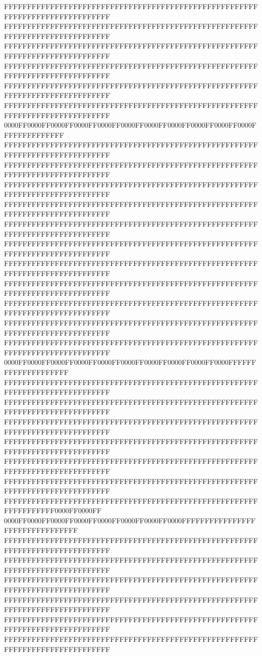 FFFFFFFFFFFFFFFFFFFFFFFFFFFFFFFFFFFFFFFFFFFFFFFFFFFFFFFFFFFFFFFFFFFFFFFFFFFFFF
FFFFFFFFFFFFFFFFFFFFFFFFFFFFFFFFFFFFFFFFFFFFFFFFFFFFFFFFFFFFFFFFFFFFFFFFFFFFFF
FFFFFFFFFFFFFFFFFFFFFFFFFFFFFFFFFFFFFFFFFFFFFFFFFFFFFFFFFFFFFFFFFFFFFFFFFFFFFF
FFFFFFFFFFFFFFFFFFFFFFFFFFFFFFFFFFFFFFFFFFFFFFFFFFFFFFFFFFFFFFFFFFFFFFFFFFFFFF
FFFFFFFFFFFFFFFFFFFFFFFFFFFFFFFFFFFFFFFFFFFFFFFFFFFFFFFFFFFFFFFFFFFFFFFFFFFFFF
FFFFFFFFFFFFFFFFFFFFFFFFFFFFFFFFFFFFFFFFFFFFFFFFFFFFFFFFFFFFFFFFFFFFFFFFFFFFFF
0000FF0000FF0000FF0000FF0000FF0000FF0000FF0000FF0000FF0000FF0000FFFFFFFFFFFFFF
FFFFFFFFFFFFFFFFFFFFFFFFFFFFFFFFFFFFFFFFFFFFFFFFFFFFFFFFFFFFFFFFFFFFFFFFFFFFFF
FFFFFFFFFFFFFFFFFFFFFFFFFFFFFFFFFFFFFFFFFFFFFFFFFFFFFFFFFFFFFFFFFFFFFFFFFFFFFF
FFFFFFFFFFFFFFFFFFFFFFFFFFFFFFFFFFFFFFFFFFFFFFFFFFFFFFFFFFFFFFFFFFFFFFFFFFFFFF
FFFFFFFFFFFFFFFFFFFFFFFFFFFFFFFFFFFFFFFFFFFFFFFFFFFFFFFFFFFFFFFFFFFFFFFFFFFFFF
FFFFFFFFFFFFFFFFFFFFFFFFFFFFFFFFFFFFFFFFFFFFFFFFFFFFFFFFFFFFFFFFFFFFFFFFFFFFFF
FFFFFFFFFFFFFFFFFFFFFFFFFFFFFFFFFFFFFFFFFFFFFFFFFFFFFFFFFFFFFFFFFFFFFFFFFFFFFF
FFFFFFFFFFFFFFFFFFFFFFFFFFFFFFFFFFFFFFFFFFFFFFFFFFFFFFFFFFFFFFFFFFFFFFFFFFFFFF
FFFFFFFFFFFFFFFFFFFFFFFFFFFFFFFFFFFFFFFFFFFFFFFFFFFFFFFFFFFFFFFFFFFFFFFFFFFFFF
FFFFFFFFFFFFFFFFFFFFFFFFFFFFFFFFFFFFFFFFFFFFFFFFFFFFFFFFFFFFFFFFFFFFFFFFFFFFFF
FFFFFFFFFFFFFFFFFFFFFFFFFFFFFFFFFFFFFFFFFFFFFFFFFFFFFFFFFFFFFFFFFFFFFFFFFFFFFF
FFFFFFFFFFFFFFFFFFFFFFFFFFFFFFFFFFFFFFFFFFFFFFFFFFFFFFFFFFFFFFFFFFFFFFFFFFFFFF
0000FF0000FF0000FF0000FF0000FF0000FF0000FF0000FF0000FF0000FFFFFFFFFFFFFFFFFFFF
FFFFFFFFFFFFFFFFFFFFFFFFFFFFFFFFFFFFFFFFFFFFFFFFFFFFFFFFFFFFFFFFFFFFFFFFFFFFFF
FFFFFFFFFFFFFFFFFFFFFFFFFFFFFFFFFFFFFFFFFFFFFFFFFFFFFFFFFFFFFFFFFFFFFFFFFFFFFF
FFFFFFFFFFFFFFFFFFFFFFFFFFFFFFFFFFFFFFFFFFFFFFFFFFFFFFFFFFFFFFFFFFFFFFFFFFFFFF
FFFFFFFFFFFFFFFFFFFFFFFFFFFFFFFFFFFFFFFFFFFFFFFFFFFFFFFFFFFFFFFFFFFFFFFFFFFFFF
FFFFFFFFFFFFFFFFFFFFFFFFFFFFFFFFFFFFFFFFFFFFFFFFFFFFFFFFFFFFFFFFFFFFFFFFFFFFFF
FFFFFFFFFFFFFFFFFFFFFFFFFFFFFFFFFFFFFFFFFFFFFFFFFFFFFFFFFFFFFFFFFFFFFFFFFFFFFF
FFFFFFFFFFFFFFFFFFFFFFFFFFFFFFFFFFFFFFFFFFFFFFFFFFFFFFFFFFFFFFFFFF0000FF0000FF
0000FF0000FF0000FF0000FF0000FF0000FF0000FF0000FFFFFFFFFFFFFFFFFFFFFFFFFFFFFFFF
FFFFFFFFFFFFFFFFFFFFFFFFFFFFFFFFFFFFFFFFFFFFFFFFFFFFFFFFFFFFFFFFFFFFFFFFFFFFFF
FFFFFFFFFFFFFFFFFFFFFFFFFFFFFFFFFFFFFFFFFFFFFFFFFFFFFFFFFFFFFFFFFFFFFFFFFFFFFF
FFFFFFFFFFFFFFFFFFFFFFFFFFFFFFFFFFFFFFFFFFFFFFFFFFFFFFFFFFFFFFFFFFFFFFFFFFFFFF
FFFFFFFFFFFFFFFFFFFFFFFFFFFFFFFFFFFFFFFFFFFFFFFFFFFFFFFFFFFFFFFFFFFFFFFFFFFFFF
FFFFFFFFFFFFFFFFFFFFFFFFFFFFFFFFFFFFFFFFFFFFFFFFFFFFFFFFFFFFFFFFFFFFFFFFFFFFFF
FFFFFFFFFFFFFFFFFFFFFFFFFFFFFFFFFFFFFFFFFFFFFFFFFFFFFFFFFFFFFFFFFFFFFFFFFFFFFF
